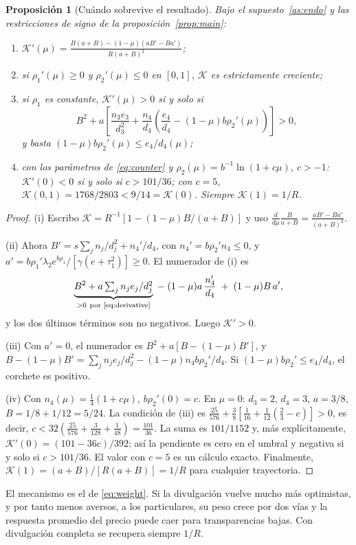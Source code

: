 \documentclass[11pt]{article}
\newcommand{\K}{\mathcal K}
\newtheorem{proposition}{Proposición}
\begin{document}
\begin{proposition}[Cuándo sobrevive el resultado]\label{prop:endo}
Bajo el supuesto~\ref{as:endo} y las restricciones de signo de la
proposición~\ref{prop:main}:
\begin{enumerate}
 \item[(i)] $\displaystyle\K'(\mu)=\frac{B(a+B)-(1-\mu)(aB'-Ba')}{R(a+B)^2}$;
 \item[(ii)] si $\rho_1'(\mu)\geq0$ y $\rho_2'(\mu)\leq0$ en $[0,1]$, $\K$ es
 estrictamente creciente;
 \item[(iii)] si $\rho_1$ es constante, $\K'(\mu)>0$ si y solo si
 \[
 B^2+a\left[\frac{n_3e_3}{d_3^2}+\frac{n_4}{d_4}
 \left(\frac{e_4}{d_4}-(1-\mu)b\rho_2'(\mu)\right)\right]>0,
 \]
 y basta $(1-\mu)b\rho_2'(\mu)\leq e_4/d_4(\mu)$;
 \item[(iv)] con los parámetros de \eqref{eq:counter} y
 $\rho_2(\mu)=b^{-1}\ln(1+c\mu)$, $c>-1$: $\K'(0)<0$ si y solo si
 $c>101/36$; con $c=5$, $\K(0{,}1)=1768/2803<9/14=\K(0)$. Siempre
 $\K(1)=1/R$.
\end{enumerate}
\end{proposition}
\begin{proof}
(i) Escribo $\K=R^{-1}[1-(1-\mu)B/(a+B)]$ y uso
$\frac{d}{d\mu}\frac{B}{a+B}=\frac{aB'-Ba'}{(a+B)^2}$.

(ii) Ahora $B'=s\sum_j n_j/d_j^2+n_4'/d_4$, con $n_4'=b\rho_2'n_4\leq0$,
y $a'=b\rho_1'\lambda_2e^{b\rho_1}/[\gamma(e+\tau_1^2)]\geq0$. El
numerador de (i) es
\[
 \underbrace{B^2+a\textstyle\sum_j n_je_j/d_j^2}_{>0\ \text{por \eqref{eq:derivative}}}
 \;-\;(1-\mu)a\,\frac{n_4'}{d_4}\;+\;(1-\mu)B\,a',
\]
y los dos últimos términos son no negativos. Luego $\K'>0$.

(iii) Con $a'=0$, el numerador es $B^2+a[B-(1-\mu)B']$, y
$B-(1-\mu)B'=\sum_j n_je_j/d_j^2-(1-\mu)n_4b\rho_2'/d_4$. Si
$(1-\mu)b\rho_2'\leq e_4/d_4$, el corchete es positivo.

(iv) Con $n_4(\mu)=\tfrac14(1+c\mu)$, $b\rho_2'(0)=c$. En $\mu=0$:
$d_3=2$, $d_4=3$, $a=3/8$, $B=1/8+1/12=5/24$. La condición de (iii) es
$\tfrac{25}{576}+\tfrac38[\tfrac1{16}+\tfrac1{12}(\tfrac23-c)]>0$, es
decir, $c<32(\tfrac{25}{576}+\tfrac3{128}+\tfrac1{48})=\tfrac{101}{36}$.
La suma es $101/1152$ y, más explícitamente,
$\K'(0)=(101-36c)/392$; así la pendiente es cero en el umbral y negativa
si y solo si $c>101/36$.
El valor con $c=5$ es un cálculo exacto. Finalmente,
$\K(1)=(a+B)/[R(a+B)]=1/R$ para cualquier trayectoria.
\end{proof}

El mecanismo es el de \eqref{eq:weight}. Si la divulgación vuelve mucho
más optimistas, y por tanto menos aversos, a los particulares, su peso
crece por dos vías y la respuesta promedio del precio puede caer para
transparencias bajas. Con divulgación completa se recupera siempre $1/R$.
\end{document}

